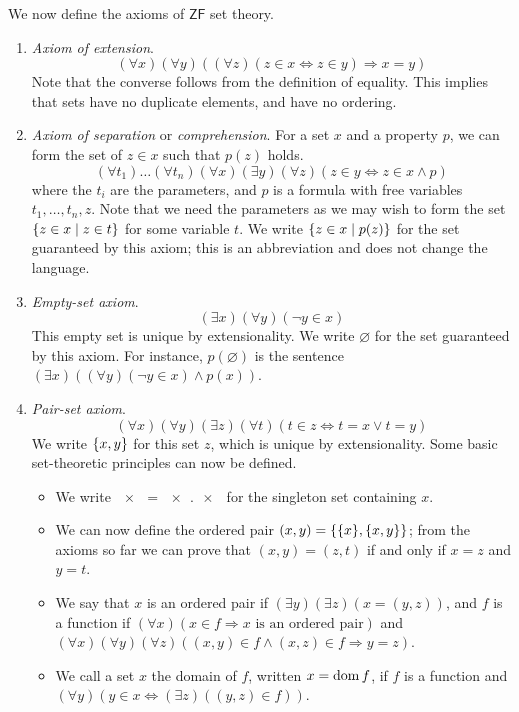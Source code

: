 We now define the axioms of \( \mathsf{ZF} \) set theory.
\begin{enumerate}
    \item \emph{Axiom of extension}.
    \[ (\forall x)(\forall y)((\forall z)(z \in x \Leftrightarrow z \in y) \Rightarrow x = y) \]
    Note that the converse follows from the definition of equality.
    This implies that sets have no duplicate elements, and have no ordering.
    \item \emph{Axiom of separation} or \emph{comprehension}.
    For a set \( x \) and a property \( p \), we can form the set of \( z \in x \) such that \( p(z) \) holds.
    \[ (\forall t_1)\dots(\forall t_n)(\forall x)(\exists y)(\forall z)(z \in y \Leftrightarrow z \in x \wedge p) \]
    where the \( t_i \) are the parameters, and \( p \) is a formula with free variables \( t_1, \dots, t_n, z \).
    Note that we need the parameters as we may wish to form the set \( \qty{z \in x \mid z \in t} \) for some variable \( t \).
    We write \( \qty{z \in x \mid p(z)} \) for the set guaranteed by this axiom; this is an abbreviation and does not change the language.
    \item \emph{Empty-set axiom}.
    \[ (\exists x)(\forall y)(\neg y \in x) \]
    This empty set is unique by extensionality.
    We write \( \varnothing \) for the set guaranteed by this axiom.
    For instance, \( p(\varnothing) \) is the sentence \( (\exists x)((\forall y)(\neg y \in x) \wedge p(x)) \).
    \item \emph{Pair-set axiom}.
    \[ (\forall x)(\forall y)(\exists z)(\forall t)(t \in z \Leftrightarrow t = x \vee t = y) \]
    We write \( \qty{x, y} \) for this set \( z \), which is unique by extensionality.
    Some basic set-theoretic principles can now be defined.
    \begin{itemize}
        \item We write \( \qty{x} = \qty{x, x} \) for the singleton set containing \( x \).
        \item We can now define the ordered pair \( (x, y) = \qty{\qty{x}, \qty{x, y}} \); from the axioms so far we can prove that \( (x, y) = (z, t) \) if and only if \( x = z \) and \( y = t \).
        \item We say that \( x \) is an ordered pair if \( (\exists y)(\exists z)(x = (y,z)) \), and \( f \) is a function if \( (\forall x)(x \in f \Rightarrow x \text{ is an ordered pair}) \) and \( (\forall x)(\forall y)(\forall z)((x,y) \in f \wedge (x,z) \in f \Rightarrow y = z) \).
        \item We call a set \( x \) the domain of \( f \), written \( x = \operatorname{dom} f \), if \( f \) is a function and \( (\forall y)(y \in x \Leftrightarrow (\exists z)((y,z) \in f)) \).

\end{itemize}
\end{enumerate}
